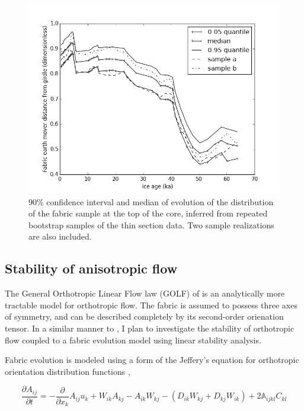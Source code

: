 \documentclass{report}
\begin{document}
\begin{figure}
\caption{90\% confidence interval and median of evolution of the distribution of the fabric sample at the top of the core, inferred from repeated bootstrap samples of the thin section data. Two sample realizations are also included.}
\includegraphics[width=12cm]{ci}
\end{figure}


\subsection{Stability of anisotropic flow}

The General Orthotropic Linear Flow law (GOLF) of \citet{gillet-chaulet2005} is an analytically more tractable model for orthotropic flow. The fabric is assumed to possess three axes of symmetry, and can be described completely by its second-order orienation tensor. In a similar manner to \citet{montgomery-smith2011}, I plan to investigate the stability of orthotropic flow coupled to a fabric evolution model using linear stability analysis.

Fabric evolution is modeled using a form of the Jeffery's equation for orthotropic orientation distribution functions \citep{gillet-chaulet2006},

\begin{equation}
   \frac{\partial A_{ij}}{\partial t} = -\frac{\partial}{\partial x_k} A_{ij} u_k + W_{ik} A_{kj} - A_{ik} W_{kj} - (D_{ik}W_{kj} + D_{kj}W_{ik}) + 2 \mathbb{A}_{ijkl} C_{kl}
\end{equation}
\end{document}
